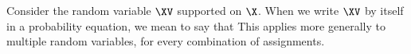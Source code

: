 \begin{note}

  Consider the random variable $\XV$ supported on $\X$. 
  When we write $\XV$ by itself in a probability equation,
  we mean to say that 
  This applies more generally to multiple random variables, 
  for every combination of assignments.
\end{note}
